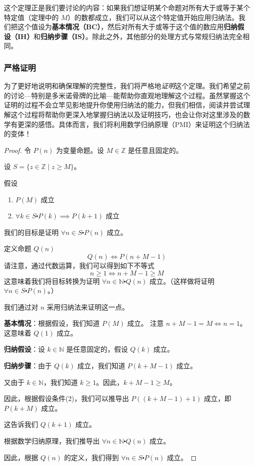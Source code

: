 这个定理正是我们要讨论的内容：如果我们想证明某个命题对所有大于或等于某个特定值（定理中的 $M$）的数都成立，我们可以从这个特定值开始应用归纳法。我们把这个值设为\textbf{基本情况（BC）}，然后对所有大于或等于这个值的数应用\textbf{归纳假设（IH）}和\textbf{归纳步骤（IS）}。除此之外，其他部分的处理方式与常规归纳法完全相同。

\subsubsection*{严格证明}

为了更好地说明和确保理解的完整性，我们将严格地\emph{证明}这个定理。我们希望之前的讨论---特别是多米诺骨牌的比喻---能帮助你直观地理解这个过程。虽然掌握这个证明的过程不会立竿见影地提升你使用归纳法的能力，但我们相信，阅读并尝试理解这个过程将帮助你更深入地掌握归纳法以及证明技巧，也会让你对这里涉及的数学有更深的感悟。具体而言，我们将利用数学归纳原理（PMI）来证明这个归纳法的变体！

\begin{proof}
    令 $P(n)$ 为变量命题。设 $M \in \mathbb{Z}$ 是任意且固定的。

    设 $S = \{z \in \mathbb{Z} \mid z \ge M\}$。

    假设
    \begin{enumerate}[label=(\arabic*)]
        \item $P(M)$ 成立
        \item $\forall k \in S \centerdot P(k) \implies P(k + 1)$ 成立
    \end{enumerate}

    我们的目标是证明 $\forall n \in S \centerdot P(n)$ 成立。

    定义命题 $Q(n)$
    \[Q(n) \iff P(n+M-1)\]
    请注意，通过代数运算，我们可以得到如下不等式
    \[n \ge 1 \iff n+M-1 \ge M\]
    这意味着我们将目标转换为证明 $\forall n \in \mathbb{N} \centerdot Q(n)$ 成立。（这样做将证明 $\forall n \in S \centerdot P(n)$。）
    
    我们通过对 $n$ 采用归纳法来证明这一点。

    \textbf{基本情况}：根据假设，我们知道 $P(M)$ 成立。 注意 $n + M - 1 = M \iff n = 1$。这意味着 $Q(1)$ 成立。

    \textbf{归纳假设}：设 $k \in \mathbb{N}$ 是任意固定的，假设 $Q(k)$ 成立。

    \textbf{归纳步骤}：由于 $Q(k)$ 成立，我们知道 $P(k + M - 1)$ 成立。

    又由于 $k \in \mathbb{N}$，我们知道 $k \ge 1$。因此，$k + M - 1 \ge M$。

    因此，根据假设条件(2)，我们可以推导出 $P((k+M-1)+1)$ 成立，即 $P(k + M)$ 成立。

    这告诉我们 $Q(k + 1)$ 成立。

    根据数学归纳原理，我们推导出 $\forall n \in \mathbb{N} \centerdot Q(n)$ 成立。

    因此，根据 $Q(n)$ 的定义，我们得到 $\forall n \in S \centerdot P(n)$ 成立。
\end{proof}

